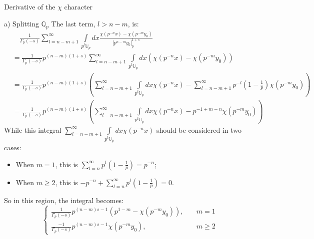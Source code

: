 \documentclass[12pt]{article}
\begin{document}
\begin{section}{Derivative of the $\chi$ character}
\begin{paragraph}{a) Splitting $\mathbb{Q}_p$}
The last term, $l>n-m$, is:
\begin{equation}
\begin{split}
&\quad\frac{1}{\Gamma_p (-s)} \sum_{l=n-m+1}^{\infty} \int\limits _{p^l \mathbb{U}_p}dx\frac{\chi( p^{-n} x) - \chi( p^{-m}y_0)}{|p^{n-m}y_0|_p^{1+s}}\\
&=\frac{1}{\Gamma_p (-s)} p^{(n-m)(1+s)} \sum_{l=n-m+1}^{\infty} \int\limits _{p^l \mathbb{U}_p}dx (\chi( p^{-n} x) - \chi( p^{-m}y_0))\\
&=\frac{1}{\Gamma_p (-s)} p^{(n-m)(1+s)} (\sum_{l=n-m+1}^{\infty} \int\limits _{p^l \mathbb{U}_p}dx \chi( p^{-n} x) - \sum_{l=n-m+1}^{\infty} p^{-l}(1-\frac{1}{p})\chi( p^{-m}y_0))\\
&=\frac{1}{\Gamma_p (-s)} p^{(n-m)(1+s)} (\sum_{l=n-m+1}^{\infty} \int\limits _{p^l \mathbb{U}_p}dx \chi( p^{-n} x) - p^{-1+m-n}\chi( p^{-m}y_0))
\end{split}
\end{equation}
While this integral $\sum_{l=n-m+1}^{\infty}\int\limits _{p^l \mathbb{U}_p}dx \chi( p^{-n} x)$ should be considered in two cases: \\
\begin{itemize}
\item When $m=1$, this is $\sum^\infty_{l=n}p^l(1-\frac{1}{p})=p^{-n}$;
\item When $m\geq 2$, this is $-p^{-n}+\sum^\infty_{l=n}p^l(1-\frac{1}{p})=0$.
\end{itemize}
So in this region, the integral becomes:
\begin{equation}
\begin{cases}
\frac{1}{\Gamma_p (-s)} p^{(n-m)s-1} (p^{1-m} - \chi( p^{-m}y_0)), \quad &m=1\\
\frac{-1}{\Gamma_p (-s)} p^{(n-m)s-1} \chi( p^{-m}y_0), \quad &m\geq 2
\end{cases}
\end{equation}
\end{paragraph}

\end{section}
\end{document}
